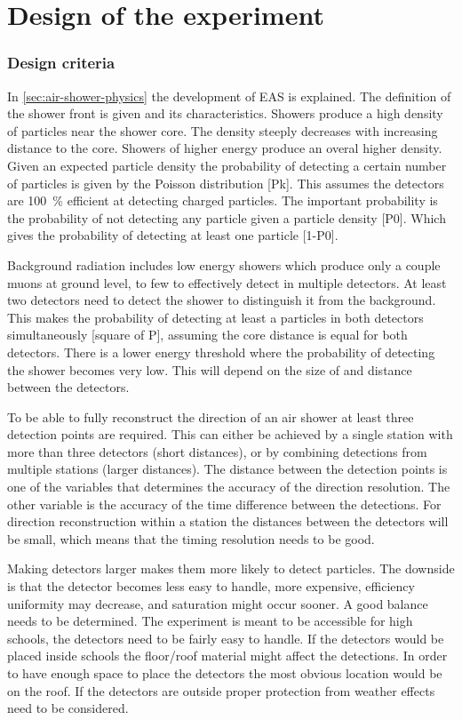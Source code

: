\chapter{Design of the \hisparc experiment}
\label{ch:experiment}

\subsection{Design criteria}

In \cref{sec:air-shower-physics} the development of EAS is explained. The definition of the shower front is given and its characteristics. Showers produce a high density of particles near the shower core. The density steeply decreases with increasing distance to the core. Showers of higher energy produce an overal higher density. Given an expected particle density the probability of detecting a certain number of particles is given by the Poisson distribution [Pk]. This assumes the detectors are \SI{100}{\percent} efficient at detecting charged particles. The important probability is the probability of not detecting any particle given a particle density [P0]. Which gives the probability of detecting at least one particle [1-P0].

Background radiation includes low energy showers which produce only a couple muons at ground level, to few to effectively detect in multiple detectors. At least two detectors need to detect the shower to distinguish it from the background. This makes the probability of detecting at least a particles in both detectors simultaneously [square of P], assuming the core distance is equal for both detectors. There is a lower energy threshold where the probability of detecting the shower becomes very low. This will depend on the size of and distance between the detectors.

To be able to fully reconstruct the direction of an air shower at least three detection points are required. This can either be achieved by a single station with more than three detectors (short distances), or by combining detections from multiple stations (larger distances). The distance between the detection points is one of the variables that determines the accuracy of the direction resolution. The other variable is the accuracy of the time difference between the detections. For direction reconstruction within a station the distances between the detectors will be small, which means that the timing resolution needs to be good.

Making detectors larger makes them more likely to detect particles. The downside is that the detector becomes less easy to handle, more expensive, efficiency uniformity may decrease, and saturation might occur sooner. A good balance needs to be determined. The experiment is meant to be accessible for high schools, the detectors need to be fairly easy to handle. If the detectors would be placed inside schools the floor/roof material might affect the detections. In order to have enough space to place the detectors the most obvious location would be on the roof. If the detectors are outside proper protection from weather effects need to be considered.


